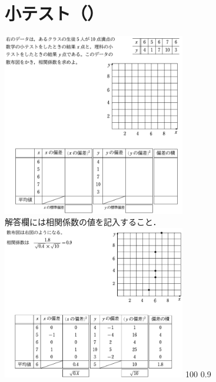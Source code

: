 \newcommand{\Release}{}%
\newcommand{\Slide}{}%
\newcommand{\PrintLecture}{1}%
\newcommand{\PrintSolution}{1}%







\section{小テスト（\MyClass）}

\begin{quiz}{\MyClass}

\QuizShortAnswer
{
  \includegraphics[width=0.6\textwidth]{quiz/problem53.png}\\
  解答欄には相関係数の値を記入すること．
}
{
  \includegraphics[width=0.6\textwidth]{quiz/solution53.png}
}
{100}
{0.9}
{}
{}
{}

\end{quiz}


